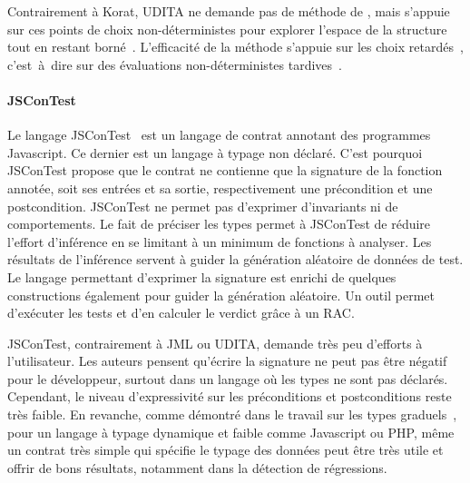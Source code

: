 Contrairement à Korat, UDITA ne demande pas de méthode de
, mais s'appuie sur ces points de choix
non-déterministes pour explorer l'espace de la structure tout en restant
borné~. L'efficacité de la méthode s'appuie
sur les choix retardés~, c'est~à~dire sur des évaluations
non-déterministes tardives~.

\paragraph{JSConTest} Le langage JSConTest~ est un langage
de contrat annotant des programmes Javascript. Ce dernier est un langage à typage
non déclaré. C'est pourquoi JSConTest propose que le contrat ne contienne que
la signature de la fonction annotée, soit ses entrées et sa sortie,
respectivement une précondition et une postcondition. JSConTest ne permet pas
d'exprimer d'invariants ni de comportements. Le fait de préciser les types
permet à JSConTest de réduire l'effort d'inférence en se limitant à un minimum
de fonctions à analyser. Les résultats de l'inférence servent à guider la
génération aléatoire de données de test. Le langage permettant d'exprimer la
signature est enrichi de quelques constructions également pour guider la
génération aléatoire. Un outil permet d'exécuter les tests et d'en calculer le
verdict grâce à un RAC.

JSConTest, contrairement à JML ou UDITA, demande très peu d'efforts à
l'utilisateur. Les auteurs pensent qu'écrire la signature ne peut pas être
négatif pour le développeur, surtout dans un langage où les types ne sont pas
déclarés. Cependant, le niveau d'expressivité sur les préconditions et
postconditions reste très faible. En revanche, comme démontré dans le travail
sur les types graduels~, pour un langage à typage dynamique et
faible comme Javascript ou PHP, même un contrat très simple qui spécifie le
typage des données peut être très utile et offrir de bons résultats, notamment
dans la détection de régressions. \\

